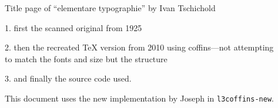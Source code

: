 \documentclass{article}
\begin{document}
\vspace*{3cm}
\begin{center}
  {\Large Title page of ``elementare typographie'' by Ivan Tschichold\par}

\large
\vspace*{1cm}

  1. first the scanned original from 1925

\vspace*{6mm}

  2. then the recreated \TeX{} version from 2010 using coffins---not
     attempting\\ to match the fonts and size but the structure

\vspace*{6mm}

  3. and finally the source code used. 

     This document uses the new
     implementation by Joseph in \texttt{l3coffins-new}.

\end{center}

\newpage


\begin{center}
  \null
\end{center}
\end{document}
